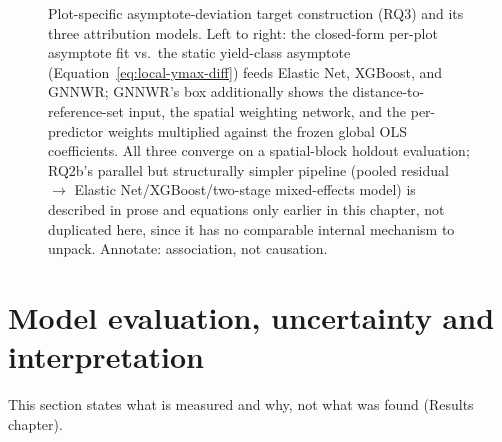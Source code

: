 \documentclass[11pt,a4paper]{report}
\begin{document}
\begin{figure}[!htbp]
\centering
{}
\caption{Plot-specific asymptote-deviation target construction (RQ3) and its three attribution
models. Left to right: the closed-form per-plot asymptote fit vs.\ the static yield-class
asymptote (Equation~\ref{eq:local-ymax-diff}) feeds Elastic Net, XGBoost, and GNNWR; GNNWR's box
additionally shows the distance-to-reference-set input, the spatial weighting network, and the
per-predictor weights multiplied against the frozen global OLS coefficients. All three converge on
a spatial-block holdout evaluation; RQ2b's parallel but structurally simpler pipeline (pooled
residual $\to$ Elastic Net/XGBoost/two-stage mixed-effects model) is described in prose and
equations only earlier in this chapter, not duplicated here, since it has no comparable internal
mechanism to unpack. Annotate: association, not causation.}
\label{fig:rq3-attribution}
\end{figure}

\section{Model evaluation, uncertainty and interpretation}
\label{sec:eval-diagnostics}
This section states what is measured and why, not what was found (Results chapter).
\end{document}
